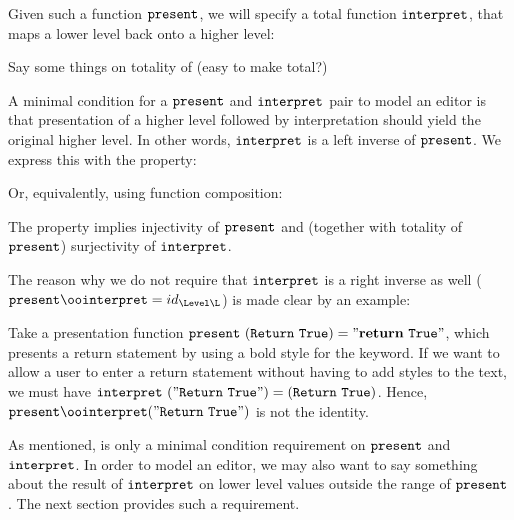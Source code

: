 

Given such a function ${\tt present}$, we will specify a total function ${\tt interpret}$, that maps a lower level back onto a higher level:


\toHere
Say some things on totality of \interpret (easy to make total?)
\fromHere


A minimal condition for a ${\tt present}$ and ${\tt interpret}$ pair to model an editor is that presentation of a higher level followed by interpretation should yield the original higher level. In other words, ${\tt interpret}$ is a left inverse of ${\tt present}$. We express this with the  property: 


Or, equivalently, using function composition:


The  property implies injectivity of ${\tt present}$ and (together with totality of ${\tt present}$) surjectivity of ${\tt interpret}$. 

The reason why we do not require that ${\tt interpret}$ is a right inverse as well ($\present \oo \interpret = id_{\Level\L}$) is made clear by an example:

Take a presentation function ${\tt present}~({\tt Return~True}) = {\tt "{\bf return}~True"}$, which presents a return statement by using a bold style for the keyword. If we want to allow a user to enter a return statement without having to add styles to the text, we must have ${\tt interpret}~({\tt "Return~True"}) = ({\tt Return~True})$. 
Hence, $\present \oo \interpret ({\tt "Return~True"}) $ is not the identity.


As mentioned,  is only a minimal condition requirement on ${\tt present}$ and ${\tt interpret}$. In order to model an editor, we may also want to say something about the result of ${\tt interpret}$ on lower level values outside the range of ${\tt present}$. The next section provides such a requirement.


